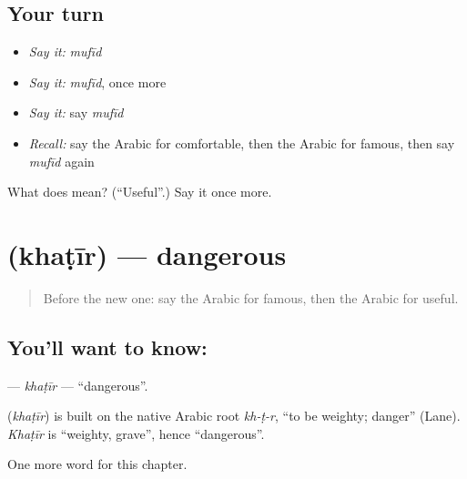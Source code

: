 \subsection*{Your turn}
\begin{itemize}
\raggedright
  \item \emph{Say it:} \emph{mufīd}
  \item \emph{Say it:} \emph{mufīd}, once more
  \item \emph{Say it:} say \emph{mufīd}
  \item \emph{Recall:} say the Arabic for comfortable, then the Arabic for famous, then say \emph{mufīd} again
\end{itemize}

\begin{tcolorbox}[breakable,colback=teal!4,colframe=teal!35!black,title={Before you move on}]
What does  mean? (\textquotedblleft{}Useful\textquotedblright{}.) Say it once more.
\end{tcolorbox}
\section[\texorpdfstring{\ar{خطير} (khaṭīr)}{خطير (khaṭīr)}]{ (khaṭīr) — dangerous}

\label{lesson:AR-C146-khatir}



\begin{quote}
Before the new one: say the Arabic for famous, then the Arabic for useful.
\end{quote}

\subsection*{You'll want to know: }
\textbf{} — \emph{khaṭīr} — \textquotedblleft{}dangerous\textquotedblright{}.

\begin{cousinweb}
\textbf{} (\emph{khaṭīr}) is built on the native Arabic root \emph{kh-ṭ-r}, \textquotedblleft{}to be weighty; danger\textquotedblright{} (Lane). \emph{Khaṭīr} is \textquotedblleft{}weighty, grave\textquotedblright{}, hence \textquotedblleft{}dangerous\textquotedblright{}.
\end{cousinweb}

\begin{grammarlens}[title={What you've built}]
One more word for this chapter.
\end{grammarlens}

